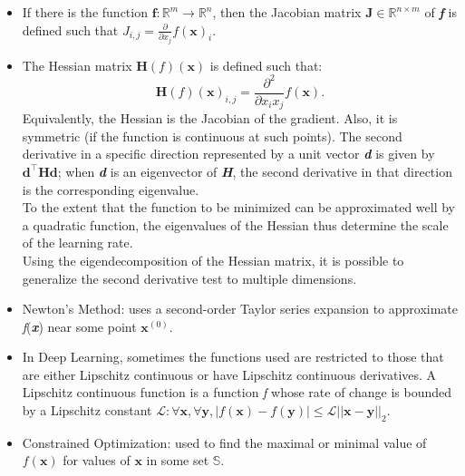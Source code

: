 \documentclass{article}
\begin{document}
\begin{itemize}
\item If there is the function \(\boldsymbol{f} : \mathbb{R}^m \to \mathbb{R}^n\), then the Jacobian matrix \(\boldsymbol{J} \in \mathbb{R}^{n \times m}\) of \textbf{\textit{f}} is defined such that \(J_{i,j} = \frac{\partial}{\partial x_j}f(\boldsymbol{x})_i\).
\item The Hessian matrix \(\boldsymbol{H}(f)(\boldsymbol{x})\) is defined such that:
\[
	\boldsymbol{H}(f)(\boldsymbol{x})_{i,j} = \frac{\partial^2}{\partial x_i x_j}f(\boldsymbol{x}).
\]
Equivalently, the Hessian is the Jacobian of the gradient. Also, it is symmetric (if the function is continuous at such points). The second derivative in a specific direction represented by a unit vector \textbf{\textit{d}} is given by \(\boldsymbol{d}^\top\boldsymbol{Hd}\); when \textbf{\textit{d}} is an eigenvector of \textbf{\textit{H}}, the second derivative in that direction is the corresponding eigenvalue.\\ To the extent that the function to be minimized can be approximated well by a quadratic function, the eigenvalues of the Hessian thus determine the scale of the learning rate.\\Using the eigendecomposition of the Hessian matrix, it is possible to generalize the second derivative test to multiple dimensions.
\item Newton's Method: uses a second-order Taylor series expansion to approximate \textit{f}(\textbf{\textit{x}}) near some point \(\boldsymbol{x}^{(0)}\).
\item In Deep Learning, sometimes the functions used are restricted to those that are either Lipschitz continuous or have Lipschitz continuous derivatives. A Lipschitz continuous function is a function \textit{f} whose rate of change is bounded by a Lipschitz constant \(\mathcal{L}: \forall\boldsymbol{x},\forall\boldsymbol{y},|f(\boldsymbol{x}) - f(\boldsymbol{y})| \leq \mathcal{L}||\boldsymbol{x}-\boldsymbol{y}||_2\).
\item Constrained Optimization: used to find the maximal or minimal value of \(f(\boldsymbol{x})\) for values of \(\boldsymbol{x}\) in some set \(\mathbb{S}\).
\end{itemize}
\end{document}
